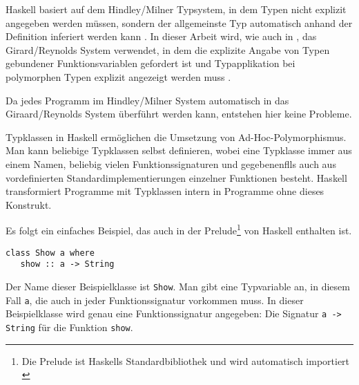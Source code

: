 Haskell basiert auf dem Hindley/Milner Typsystem, in dem Typen nicht explizit angegeben werden müssen, sondern der allgemeinste
Typ automatisch anhand der Definition inferiert werden kann \cite{wadler}. In dieser Arbeit wird, wie auch in \cite{wadler}, das
Girard/Reynolds System verwendet, in dem die explizite Angabe von Typen gebundener Funktionsvariablen gefordert ist und
Typapplikation bei polymorphen Typen explizit angezeigt werden muss \cite{wadler}.

Da jedes Programm im Hindley/Milner System automatisch in das Giraard/Reynolds System überführt werden kann, entstehen hier
keine Probleme.





Typklassen in Haskell ermöglichen die Umsetzung von Ad-Hoc-Polymorphismus. Man kann beliebige Typklassen selbst definieren,
wobei eine Typklasse immer aus einem Namen, beliebig vielen Funktionssignaturen und gegebenenflls auch aus vordefinierten
Standardimplementierungen einzelner Funktionen besteht. Haskell transformiert Programme mit Typklassen intern in Programme
ohne dieses Konstrukt.

Es folgt ein einfaches Beispiel, das auch in der Prelude\footnote{Die Prelude ist Haskells Standardbibliothek und wird automatisch importiert \cite{haskell}} von Haskell enthalten ist.


\begin{verbatim}
class Show a where
   show :: a -> String
\end{verbatim}

Der Name dieser Beispielklasse ist \texttt{Show}. Man gibt eine Typvariable an, in diesem Fall \texttt{a}, die auch in jeder
Funktionssignatur vorkommen muss. In dieser Beispielklasse wird genau eine Funktionssignatur angegeben: Die Signatur
\texttt{a -> String} für die Funktion \texttt{show}.

